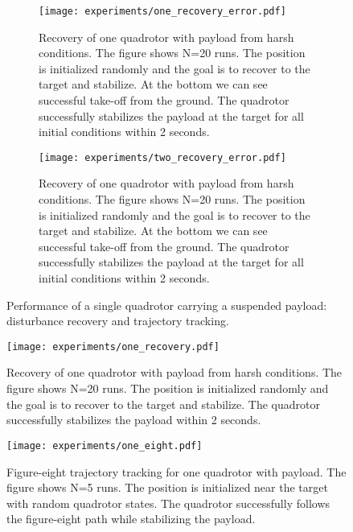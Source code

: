 \begin{figure}[ht]
    \centering
    \begin{subfigure}[b]{0.49\textwidth}
        \centering
        
        \texttt{[image: experiments/one\_recovery\_error.pdf]}
        \caption{Recovery of one quadrotor with payload from harsh conditions. The figure shows N=20 runs. The position is initialized randomly and the goal is to recover to the target and stabilize. At the bottom we can see successful take-off from the ground. The quadrotor successfully stabilizes the payload at the target for all initial conditions within 2 seconds.}
        \label{fig:payload_error_over_time}
    \end{subfigure}
    \hfill
     \begin{subfigure}[b]{0.49\textwidth}
        \centering
        
        \texttt{[image: experiments/two\_recovery\_error.pdf]}
        \caption{Recovery of one quadrotor with payload from harsh conditions. The figure shows N=20 runs. The position is initialized randomly and the goal is to recover to the target and stabilize. At the bottom we can see successful take-off from the ground. The quadrotor successfully stabilizes the payload at the target for all initial conditions within 2 seconds.}
        \label{fig:payload_error_over_time}
    \end{subfigure}
    \caption{Performance of a single quadrotor carrying a suspended payload: disturbance recovery and trajectory tracking.}
    \label{fig:single_quad_payload_subfigs}
\end{figure}



\begin{figure}[ht]
    \centering
    
    \texttt{[image: experiments/one\_recovery.pdf]}
    \caption{Recovery of one quadrotor with payload from harsh conditions. The figure shows N=20 runs. The position is initialized randomly and the goal is to recover to the target and stabilize. The quadrotor successfully stabilizes the payload within 2 seconds.}
    \label{fig:payload_error_over_time}
\end{figure}
\begin{figure}[ht]
    \centering
    
    \texttt{[image: experiments/one\_eight.pdf]}
    \caption{Figure-eight trajectory tracking for one quadrotor with payload. The figure shows N=5 runs. The position is initialized near the target with random quadrotor states. The quadrotor successfully follows the figure-eight path while stabilizing the payload.}
    \label{fig:payload_error_over_time}
\end{figure}

